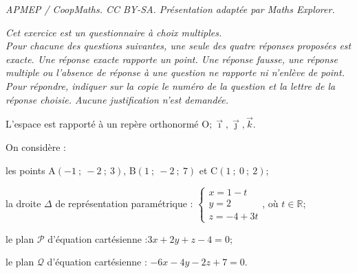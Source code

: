 \documentclass[10pt]{article}
\providecommand{\R}{\mathbb{R}}
\providecommand{\Oijk}{\(\mathrm{O};\vec{\imath},\vec{\jmath},\vec{k}\)}
\begin{document}
\noindent\textit{APMEP / CoopMaths. CC BY-SA. Présentation adaptée par Maths Explorer.}\par\medskip
\medskip

\emph{Cet exercice est un questionnaire à choix multiples.\\
Pour chacune des questions suivantes, une seule des quatre réponses proposées est exacte. Une réponse exacte rapporte un point. Une réponse fausse, une réponse multiple ou l'absence de réponse à une question ne rapporte ni n'enlève de point. Pour répondre, indiquer sur la copie le numéro de la question et la lettre de la réponse choisie. Aucune justification n'est demandée.}

\bigskip

L'espace est rapporté à un repère orthonormé \Oijk.

\medskip
On considère :

les points A$(-1~;~-2~;~3)$, B$(1~;~-2~;~7)$ et C$(1~;~0~;~2)$;

la droite $\Delta$ de représentation paramétrique : \quad $\left\{\begin{array}{l}x=1-t \\ y=2 \\ z=-4+3 t\end{array}\right.$, où $t \in \R$;

le plan $\mathcal{P}$ d'équation cartésienne :\quad $3 x+2 y+z-4=0$;

le plan $\mathcal{Q}$ d'équation cartésienne : \quad $-6 x-4 y-2 z+7=0$.
\end{document}
